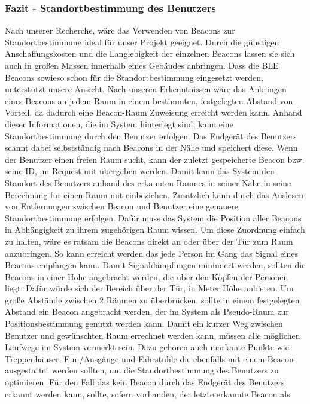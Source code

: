 \subsubsection{Fazit - Standortbestimmung des Benutzers}
\label{sec:Fazit_Standortbestimmung}

Nach unserer Recherche, wäre das Verwenden von Beacons zur Standortbestimmung
ideal für unser Projekt geeignet. Durch die günstigen Anschaffungskosten und
die Langlebigkeit der einzelnen Beacons lassen sie sich auch in großen Massen
innerhalb eines Gebäudes anbringen. Dass die BLE Beacons sowieso schon für die
Standortbestimmung eingesetzt werden, unterstützt unsere Ansicht.
Nach unseren Erkenntnissen wäre das Anbringen eines Beacons an jedem Raum
\bzw in einem bestimmten, festgelegten Abstand von Vorteil, da dadurch eine
Beacon-Raum Zuweisung erreicht werden kann. Anhand dieser Informationen, die im
System hinterlegt sind, kann eine Standortbestimmung durch den Benutzer
erfolgen. Das Endgerät des Benutzers scannt dabei selbstständig nach Beacons in
der Nähe und speichert diese. Wenn der Benutzer einen freien Raum sucht, kann
der zuletzt gespeicherte Beacon bzw. seine ID, im Request mit übergeben werden.
Damit kann das System den Standort des Benutzers anhand des erkannten Raumes in
seiner Nähe in seine Berechnung für einen Raum mit einbeziehen. Zusätzlich kann
durch das Auslesen von Entfernungen zwischen Beacon und Benutzer eine genauere
Standortbestimmung erfolgen. Dafür muss das System die Position aller Beacons in
Abhängigkeit zu ihrem zugehörigen Raum wissen. Um diese Zuordnung einfach zu
halten, wäre es ratsam die Beacons direkt an oder über der Tür zum Raum
anzubringen. So kann erreicht werden das jede Person im Gang das Signal eines
Beacons empfangen kann. Damit Signaldämpfungen minimiert werden, sollten die
Beacons in einer Höhe angebracht werden, die über den Köpfen der Personen
liegt. Dafür würde sich der Bereich über der Tür, in  Meter Höhe anbieten.
Um große Abstände zwischen 2 Räumen zu überbrücken, sollte in einem
festgelegten Abstand ein Beacon angebracht werden, der im System als
Pseudo-Raum zur Positionsbestimmung genutzt werden kann. Damit ein kurzer Weg
zwischen Benutzer und gewünschten Raum errechnet werden kann, müssen alle
möglichen Laufwege im System vermerkt sein. Dazu gehören auch markante Punkte
wie Treppenhäuser, Ein-/Ausgänge und Fahrstühle die ebenfalls mit einem Beacon
ausgestattet werden sollten, um die Standortbestimmung des Benutzers zu
optimieren. Für den Fall das kein Beacon durch das Endgerät des Benutzers
erkannt werden kann, sollte, sofern vorhanden, der letzte erkannte Beacon als
